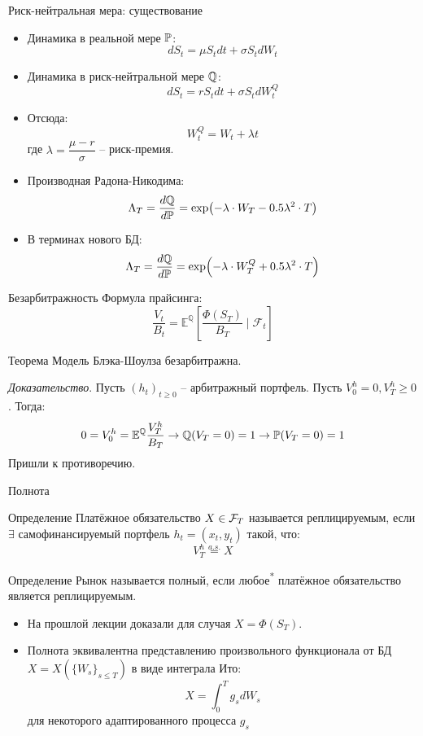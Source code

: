 \documentclass[aspectratio=169]{beamer}
\begin{document}
\begin{frame}{Риск-нейтральная мера: существование}
    \begin{itemize}
        \item Динамика в реальной мере $\mathbb{P}$:
        $$
            dS_t = \mu S_t dt + \sigma S_t dW_t
        $$
        \item Динамика в риск-нейтральной мере $\mathbb{Q}$:
        $$
            dS_t = r S_t dt + \sigma S_t dW_t^Q
        $$ 
        \item  Отсюда:
        $$
            W_t^Q = W_t + \lambda t 
        $$ где $\lambda = \dfrac{\mu - r}{\sigma}$ -- риск-премия.
        \item Производная Радона-Никодима:
        $$
            \Lambda_T = \dfrac{d\mathbb{Q}}{d\mathbb{P}} = \exp(-\lambda \cdot W_T - 0.5 \lambda^2 \cdot T)
        $$
        \item В терминах нового БД:
        $$
            \Lambda_T = \dfrac{d\mathbb{Q}}{d\mathbb{P}} = \exp(-\lambda \cdot W_T^Q + 0.5 \lambda^2 \cdot T)
        $$
    \end{itemize}
\end{frame}


\begin{frame}{Безарбитражность}
    Формула прайсинга:
    $$
        \dfrac{V_t}{B_t} = \mathbb{E}^{\mathbb{Q}}
        \left[ \dfrac{\Phi(S_T)}{B_T} \mid \mathcal{F}_t\right]
    $$
    \begin{block}{Теорема}
        Модель Блэка-Шоулза безарбитражна. 
    \end{block}
    \textit{Доказательство}. Пусть $(h_t)_{t\geq 0}$ -- арбитражный портфель. Пусть $V_0^h = 0, V_T^h \geq 0$. Тогда:
    $$
        0 = V_0^h = \mathbb{E}^{\mathbb{Q}} \dfrac{V_T^h}{B_T} \to \mathbb{Q}(V_T = 0) = 1
        \to \mathbb{P}(V_T=0)=1
    $$Пришли к противоречию.
\end{frame}

\begin{frame}{Полнота}
    \begin{block}{Определение}
        Платёжное обязательство $X\in\mathcal{F}_T$ называется реплицируемым, если $\exists$ самофинансируемый портфель $h_t=(x_t, y_t)$ такой, что:
        $$
            V_T^h \overset{a.s.}{=} X
        $$
    \end{block}
    \begin{block}{Определение}
        Рынок называется полный, если любое\textsuperscript{*} платёжное обязательство является реплицируемым.
    \end{block}
    \begin{itemize}
        \item На прошлой лекции доказали для случая $X = \Phi(S_T)$.
        \item Полнота эквивалентна представлению произвольного функционала от БД $X = X(\{W_s\}_{s \leq T})$ в виде интеграла Ито:
        $$
            X = \int_0^T g_s dW_s
        $$для некоторого адаптированного процесса $g_s$
    \end{itemize}
\end{frame}
\end{document}
